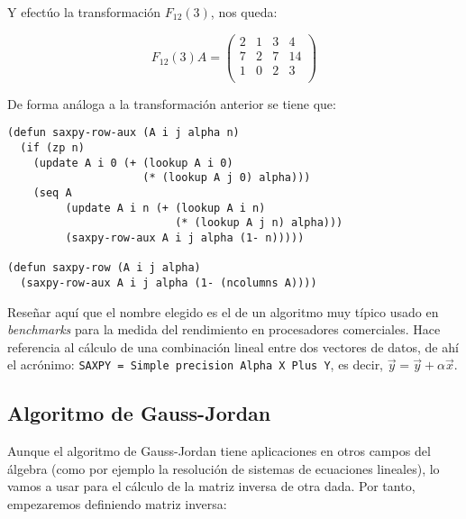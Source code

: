 \documentclass[a4paper,10pt]{article}
\begin{document}
Y efectúo la transformación $F_{12}(3)$, nos queda:

\par \vspace{10pt}

$$
F_{12}(3)A=
\begin{pmatrix}
2 & 1 & 3 & 4 \\
7 & 2 & 7 & 14 \\
1 & 0 & 2 & 3 \\ 
\end{pmatrix}
$$ 

\par \vspace{10pt}

De forma análoga a la transformación anterior se tiene que:

\par \vspace{10pt}

\begin{lstlisting}[language=clips]
(defun saxpy-row-aux (A i j alpha n)
  (if (zp n)
    (update A i 0 (+ (lookup A i 0) 
                     (* (lookup A j 0) alpha)))
    (seq A
         (update A i n (+ (lookup A i n) 
                          (* (lookup A j n) alpha)))
         (saxpy-row-aux A i j alpha (1- n)))))
       
(defun saxpy-row (A i j alpha)
  (saxpy-row-aux A i j alpha (1- (ncolumns A))))
\end{lstlisting}

\par \vspace{10pt}

Reseñar aquí que el nombre elegido es el de un algoritmo muy típico usado en \emph{benchmarks} para la medida del rendimiento en procesadores comerciales. Hace referencia al cálculo de una combinación lineal entre dos vectores de datos, de ahí el acrónimo: \texttt{SAXPY = Simple precision Alpha X Plus Y}, es decir, $\vec{y} = \vec{y} + \alpha \vec{x}$.

\vspace{12pt}
\subsection{Algoritmo de Gauss-Jordan}
\vspace{10pt}

Aunque el algoritmo de Gauss-Jordan tiene aplicaciones en otros campos del álgebra (como por ejemplo la resolución de sistemas de ecuaciones lineales), lo vamos a usar para el cálculo de la matriz inversa de otra dada. Por tanto, empezaremos definiendo matriz inversa:
\end{document}
